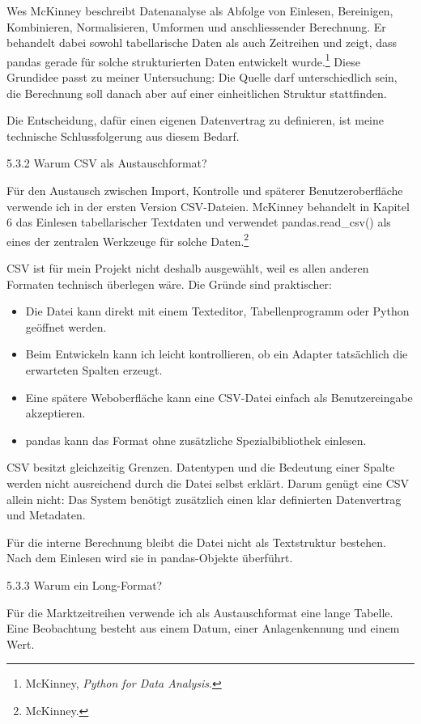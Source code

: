 \documentclass[
  ngerman,
  a4paper,
  DIV=11,
  oneside]{scrreprt}
\providecommand{\tightlist}{%
  \setlength{\itemsep}{0pt}\setlength{\parskip}{0pt}}
\begin{document}
Wes McKinney beschreibt Datenanalyse als Abfolge von Einlesen,
Bereinigen, Kombinieren, Normalisieren, Umformen und anschliessender
Berechnung. Er behandelt dabei sowohl tabellarische Daten als auch
Zeitreihen und zeigt, dass pandas gerade für solche strukturierten Daten
entwickelt wurde.\footnote{McKinney, \emph{Python for Data Analysis}.}
Diese Grundidee passt zu meiner Untersuchung: Die Quelle darf
unterschiedlich sein, die Berechnung soll danach aber auf einer
einheitlichen Struktur stattfinden.

Die Entscheidung, dafür einen eigenen Datenvertrag zu definieren, ist
meine technische Schlussfolgerung aus diesem Bedarf.

5.3.2 Warum CSV als Austauschformat?

Für den Austausch zwischen Import, Kontrolle und späterer
Benutzeroberfläche verwende ich in der ersten Version CSV-Dateien.
McKinney behandelt in Kapitel 6 das Einlesen tabellarischer Textdaten
und verwendet pandas.read\_csv() als eines der zentralen Werkzeuge für
solche Daten.\footnote{McKinney.}

CSV ist für mein Projekt nicht deshalb ausgewählt, weil es allen anderen
Formaten technisch überlegen wäre. Die Gründe sind praktischer:

\begin{itemize}
\tightlist
\item
  Die Datei kann direkt mit einem Texteditor, Tabellenprogramm oder
  Python geöffnet werden.
\item
  Beim Entwickeln kann ich leicht kontrollieren, ob ein Adapter
  tatsächlich die erwarteten Spalten erzeugt.
\item
  Eine spätere Weboberfläche kann eine CSV-Datei einfach als
  Benutzereingabe akzeptieren.
\item
  pandas kann das Format ohne zusätzliche Spezialbibliothek einlesen.
\end{itemize}

CSV besitzt gleichzeitig Grenzen. Datentypen und die Bedeutung einer
Spalte werden nicht ausreichend durch die Datei selbst erklärt. Darum
genügt eine CSV allein nicht: Das System benötigt zusätzlich einen klar
definierten Datenvertrag und Metadaten.

Für die interne Berechnung bleibt die Datei nicht als Textstruktur
bestehen. Nach dem Einlesen wird sie in pandas-Objekte überführt.

5.3.3 Warum ein Long-Format?

Für die Marktzeitreihen verwende ich als Austauschformat eine lange
Tabelle. Eine Beobachtung besteht aus einem Datum, einer Anlagenkennung
und einem Wert.
\end{document}
